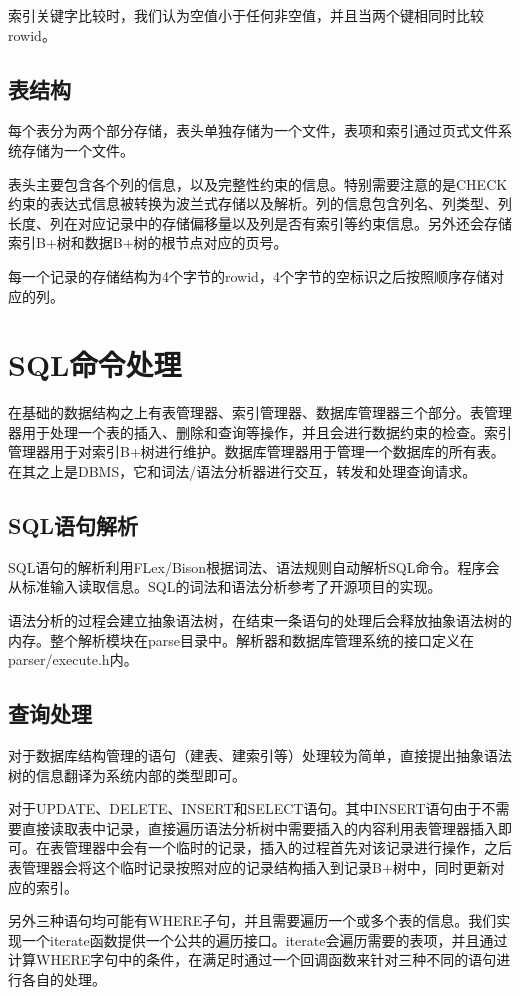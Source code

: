 \documentclass[10pt]{article}
\begin{document}
索引关键字比较时，我们认为空值小于任何非空值，并且当两个键相同时比较rowid。

\subsection{表结构}
每个表分为两个部分存储，表头单独存储为一个文件，表项和索引通过页式文件系统存储为一个文件。

表头主要包含各个列的信息，以及完整性约束的信息。特别需要注意的是CHECK约束的表达式信息被转换为波兰式存储以及解析。列的信息包含列名、列类型、列长度、列在对应记录中的存储偏移量以及列是否有索引等约束信息。另外还会存储索引B+树和数据B+树的根节点对应的页号。

每一个记录的存储结构为4个字节的rowid，4个字节的空标识之后按照顺序存储对应的列。
\section{SQL命令处理}
在基础的数据结构之上有表管理器、索引管理器、数据库管理器三个部分。表管理器用于处理一个表的插入、删除和查询等操作，并且会进行数据约束的检查。索引管理器用于对索引B+树进行维护。数据库管理器用于管理一个数据库的所有表。在其之上是DBMS，它和词法/语法分析器进行交互，转发和处理查询请求。

\subsection{SQL语句解析}
SQL语句的解析利用FLex/Bison根据词法、语法规则自动解析SQL命令。程序会从标准输入读取信息。SQL的词法和语法分析参考了开源项目的实现。

语法分析的过程会建立抽象语法树，在结束一条语句的处理后会释放抽象语法树的内存。整个解析模块在parse目录中。解析器和数据库管理系统的接口定义在parser/execute.h内。
\subsection{查询处理}
对于数据库结构管理的语句（建表、建索引等）处理较为简单，直接提出抽象语法树的信息翻译为系统内部的类型即可。

对于UPDATE、DELETE、INSERT和SELECT语句。其中INSERT语句由于不需要直接读取表中记录，直接遍历语法分析树中需要插入的内容利用表管理器插入即可。在表管理器中会有一个临时的记录，插入的过程首先对该记录进行操作，之后表管理器会将这个临时记录按照对应的记录结构插入到记录B+树中，同时更新对应的索引。

另外三种语句均可能有WHERE子句，并且需要遍历一个或多个表的信息。我们实现一个iterate函数提供一个公共的遍历接口。iterate会遍历需要的表项，并且通过计算WHERE字句中的条件，在满足时通过一个回调函数来针对三种不同的语句进行各自的处理。
\end{document}

